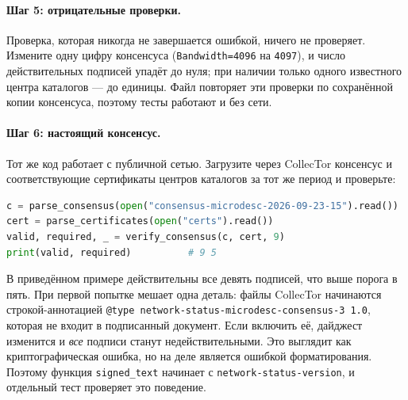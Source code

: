 \paragraph{Шаг 5: отрицательные проверки.} Проверка, которая никогда не завершается ошибкой, ничего не проверяет. Измените одну цифру консенсуса (\texttt{Bandwidth=4096} на \texttt{4097}), и число действительных подписей упадёт до нуля; при наличии только одного известного центра каталогов --- до единицы. Файл  повторяет эти проверки по сохранённой копии консенсуса, поэтому тесты работают и без сети.

\paragraph{Шаг 6: настоящий консенсус.} Тот же код работает с публичной сетью. Загрузите через CollecTor консенсус и соответствующие сертификаты центров каталогов за тот же период и проверьте:
\begin{lstlisting}[language=Python,numbers=none]
c = parse_consensus(open("consensus-microdesc-2026-09-23-15").read())
cert = parse_certificates(open("certs").read())
valid, required, _ = verify_consensus(c, cert, 9)
print(valid, required)          # 9 5
\end{lstlisting}
В приведённом примере действительны все девять подписей, что выше порога в пять. При первой попытке мешает одна деталь: файлы CollecTor начинаются строкой-аннотацией \texttt{@type network-status-microdesc-consensus-3 1.0}, которая не входит в подписанный документ. Если включить её, дайджест изменится и \emph{все} подписи станут недействительными. Это выглядит как криптографическая ошибка, но на деле является ошибкой форматирования. Поэтому функция \texttt{signed\_text} начинает с \texttt{network-status-version}, и отдельный тест проверяет это поведение.

